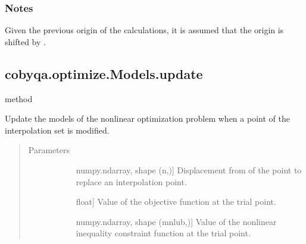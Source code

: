 \documentclass[letterpaper,10pt,english]{sphinxmanual}
\begin{document}
\begin{fulllineitems}
\begin{fulllineitems}
\subsubsection*{Notes}

\sphinxAtStartPar
Given  the previous origin of the calculations, it is assumed
that the origin is shifted by .

\end{fulllineitems}



\subsection{cobyqa.optimize.Models.update}
\label{\detokenize{refs/generated/cobyqa.optimize.Models.update:cobyqa-optimize-models-update}}\label{\detokenize{refs/generated/cobyqa.optimize.Models.update::doc}}
\sphinxAtStartPar
method

\begin{fulllineitems}
\label{\detokenize{refs/generated/cobyqa.optimize.Models.update:cobyqa.optimize.Models.update}}
\sphinxAtStartPar
Update the models of the nonlinear optimization problem when a point of
the interpolation set is modified.
\begin{quote}\begin{description}
\item[{Parameters}] \leavevmode\begin{description}
\item[{}] \leavevmode{[}numpy.ndarray, shape (n,){]}
\sphinxAtStartPar
Displacement from  of the point to replace an interpolation
point.

\item[{}] \leavevmode{[}float{]}
\sphinxAtStartPar
Value of the objective function at the trial point.

\item[{}] \leavevmode{[}numpy.ndarray, shape (mnlub,){]}
\sphinxAtStartPar
Value of the nonlinear inequality constraint function at the trial
point.


\end{description}
\end{description}
\end{quote}
\end{fulllineitems}
\end{fulllineitems}
\end{document}
